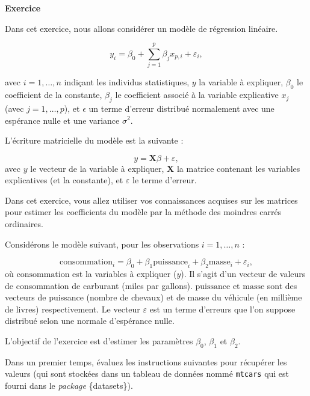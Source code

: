 \documentclass[
  11pt,
]{book}
\newenvironment{Shaded}{\begin{snugshade}}{\end{snugshade}}
\newcommand{\NormalTok}[1]{#1}
\newcommand{\OtherTok}[1]{\textcolor[rgb]{0.56,0.35,0.01}{#1}}
\newcommand{\SpecialCharTok}[1]{\textcolor[rgb]{0.81,0.36,0.00}{\textbf{#1}}}
\numberwithin{equation}{section}
\numberwithin{countremarque}{section}
\newenvironment{greenbox}{
  \begin{tcolorbox}[breakable, colback=vert,coltext=black,
                  colframe=grisfonce]}
 {\end{tcolorbox}}
\begin{document}
\begin{greenbox}

\textbf{Exercice}

Dans cet exercice, nous allons considérer un modèle de régression linéaire.

\[y_i = \beta_0 + \sum_{j=1}^{p} \beta_j x_{p,i} + \varepsilon_i,\]

avec \(i=1,\ldots, n\) indiçant les individus statistiques, \(y\) la variable à expliquer, \(\beta_0\) le coefficient de la constante, \(\beta_j\) le coefficient associé à la variable explicative \(x_j\) (avec \(j=1, \ldots, p\)), et \(\epsilon\) un terme d'erreur distribué normalement avec une espérance nulle et une variance \(\sigma^2\).

L'écriture matricielle du modèle est la suivante :

\[y = \boldsymbol{X} \beta + \varepsilon,\]
avec \(y\) le vecteur de la variable à expliquer, \(\boldsymbol X\) la matrice contenant les variables explicatives (et la constante), et \(\varepsilon\) le terme d'erreur.

Dans cet exercice, vous allez utiliser vos connaissances acquises sur les matrices pour estimer les coefficients du modèle par la méthode des moindres carrés ordinaires.

Considérons le modèle suivant, pour les observations \(i=1,\ldots, n\) :

\[\textrm{consommation}_i = \beta_0 + \beta_1 \textrm{puissance}_i + \beta_2 \textrm{masse}_i + \varepsilon_i,\]
où \(\textrm{consommation}\) est la variables à expliquer (\(y\)). Il s'agit d'un vecteur de valeurs de consommation de carburant (miles par gallons). \(\textrm{puissance}\) et \(\textrm{masse}\) sont des vecteurs de puissance (nombre de chevaux) et de masse du véhicule (en millième de livres) respectivement. Le vecteur \(\varepsilon\) est un terme d'erreurs que l'on suppose distribué selon une normale d'espérance nulle.

L'objectif de l'exercice est d'estimer les paramètres \(\beta_0\), \(\beta_1\) et \(\beta_2\).

Dans un premier temps, évaluez les instructions suivantes pour récupérer les valeurs (qui sont stockées dans un tableau de données nommé \texttt{mtcars} qui est fourni dans le \emph{package} \{datasets\}).

\begin{Shaded}
\end{Shaded}


\end{greenbox}
\end{document}
